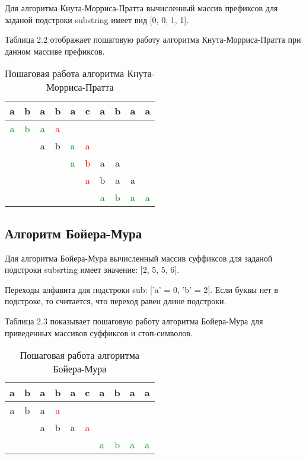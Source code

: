 \documentclass[a4paper,12pt]{report}
\begin{document}
\hspace{0.6cm}Для алгоритма Кнута-Морриса-Пратта вычисленный массив префиксов для заданой подстроки substring имеет вид [0, 0, 1, 1].

Таблица 2.2 отображает пошаговую работу алгоритма Кнута-Морриса-Пратта при данном массиве префиксов.

\begin{table}[ht!]
\begin{center}
\caption{Пошаговая работа алгоритма Кнута-Морриса-Пратта}
\begin{tabular}{| c | c | c | c | c | c | c | c | c | c | }
	\hline
	a&b&a&b&a&c&a&b&a&a \\
	\hline
	\hline
	\textcolor{green}{a}&\textcolor{green}{b}&\textcolor{green}{a}&\textcolor{red}{a}&&&&&&\\
	\hline
	&&a&b&\textcolor{green}{a}&\textcolor{red}{a}&&&&\\
	\hline
	&&&&\textcolor{green}{a}&\textcolor{red}{b}&a&a&&\\
	\hline
	&&&&&\textcolor{red}{a}&b&a&a&\\
	\hline
	&&&&&&\textcolor{green}{a}&\textcolor{green}{b}&\textcolor{green}{a}&\textcolor{green}{a}\\
	\hline
\end{tabular}
\end{center}
\end{table}

\subsection{Алгоритм Бойера-Мура}

\hspace{0.6cm}Для алгоритма Бойера-Мура вычисленный массив суффиксов для заданой подстроки subsrting имеет значение: [2, 5, 5, 6].

Переходы алфавита для подстроки sub:  ['a' = 0, 'b' = 2]. Если буквы нет в подстроке, то считается, что переход равен длине подстроки.

Таблица 2.3 показывает пошаговую работу алгоритма Бойера-Мура для приведенных массивов суффиксов и стоп-символов.

\begin{table}[ht!]
\begin{center}
\caption{Пошаговая работа алгоритма Бойера-Мура}
\begin{tabular}{| c | c | c | c | c | c | c | c | c | c | }
	\hline
	a&b&a&b&a&c&a&b&a&a \\
	\hline
	\hline
	a&b&a&\textcolor{red}{a}&&&&&&\\
	\hline
	&&a&b&a&\textcolor{red}{a}&&&&\\
	\hline
	&&&&&&\textcolor{green}{a}&\textcolor{green}{b}&\textcolor{green}{a}&\textcolor{green}{a}\\
	\hline
\end{tabular}
\end{center}
\end{table}
\end{document}
